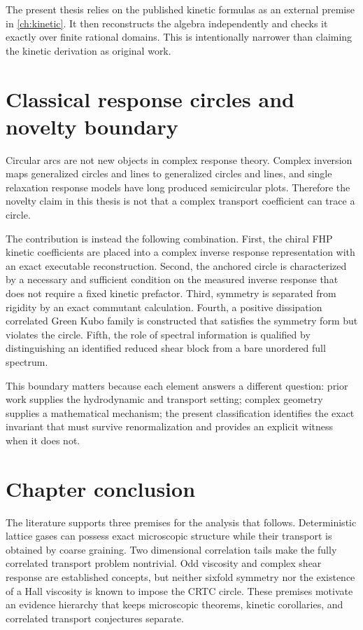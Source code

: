 The present thesis relies on the published kinetic formulas as an external premise in \cref{ch:kinetic}. It then reconstructs the algebra independently and checks it exactly over finite rational domains. This is intentionally narrower than claiming the kinetic derivation as original work.

\section{Classical response circles and novelty boundary}
Circular arcs are not new objects in complex response theory. Complex inversion maps generalized circles and lines to generalized circles and lines, and single relaxation response models have long produced semicircular plots. Therefore the novelty claim in this thesis is not that a complex transport coefficient can trace a circle.

The contribution is instead the following combination. First, the chiral FHP kinetic coefficients are placed into a complex inverse response representation with an exact executable reconstruction. Second, the anchored circle is characterized by a necessary and sufficient condition on the measured inverse response that does not require a fixed kinetic prefactor. Third, symmetry is separated from rigidity by an exact commutant calculation. Fourth, a positive dissipation correlated Green Kubo family is constructed that satisfies the symmetry form but violates the circle. Fifth, the role of spectral information is qualified by distinguishing an identified reduced shear block from a bare unordered full spectrum.

This boundary matters because each element answers a different question: prior work supplies the hydrodynamic and transport setting; complex geometry supplies a mathematical mechanism; the present classification identifies the exact invariant that must survive renormalization and provides an explicit witness when it does not.

\section{Chapter conclusion}
The literature supports three premises for the analysis that follows. Deterministic lattice gases can possess exact microscopic structure while their transport is obtained by coarse graining. Two dimensional correlation tails make the fully correlated transport problem nontrivial. Odd viscosity and complex shear response are established concepts, but neither sixfold symmetry nor the existence of a Hall viscosity is known to impose the CRTC circle. These premises motivate an evidence hierarchy that keeps microscopic theorems, kinetic corollaries, and correlated transport conjectures separate.
